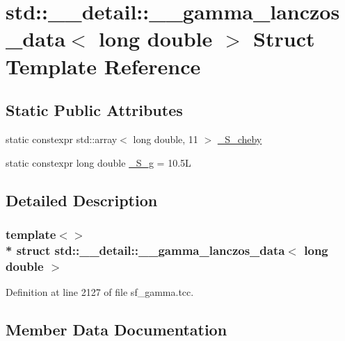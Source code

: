 \hypertarget{structstd_1_1____detail_1_1____gamma__lanczos__data_3_01long_01double_01_4}{}\section{std\+:\+:\+\_\+\+\_\+detail\+:\+:\+\_\+\+\_\+gamma\+\_\+lanczos\+\_\+data$<$ long double $>$ Struct Template Reference}
\label{structstd_1_1____detail_1_1____gamma__lanczos__data_3_01long_01double_01_4}
\subsection*{Static Public Attributes}
\begin{DoxyCompactItemize}
\item 
static constexpr std\+::array$<$ long double, 11 $>$ \hyperlink{structstd_1_1____detail_1_1____gamma__lanczos__data_3_01long_01double_01_4_a7968f4e72045e6a2b09244c678ddf3cc}{\+\_\+\+S\+\_\+cheby}
\item 
static constexpr long double \hyperlink{structstd_1_1____detail_1_1____gamma__lanczos__data_3_01long_01double_01_4_af86428283206e8b9bd3dc5709855c901}{\+\_\+\+S\+\_\+g} = 10.\+5L
\end{DoxyCompactItemize}


\subsection{Detailed Description}
\subsubsection*{template$<$$>$\\*
struct std\+::\+\_\+\+\_\+detail\+::\+\_\+\+\_\+gamma\+\_\+lanczos\+\_\+data$<$ long double $>$}



Definition at line 2127 of file sf\+\_\+gamma.\+tcc.



\subsection{Member Data Documentation}
